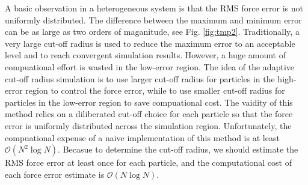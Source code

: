 \documentclass[aps,pre,preprint]{revtex4}
\begin{document}
A basic observation in a heterogeneous system is that the RMS force
error is not uniformly distributed. The difference between the maximum
and minimum error can be as large as two orders of maganitude, see
Fig. \ref{fig:tmp2}. Traditionally, a very large cut-off radius is
used to reduce the maximum error to an acceptable level and to reach
convergent simulation results. However, a huge amount of compuational
effort is wasted in the low-error region. The idea of the adaptive
cut-off radius simulation is to use larger cut-off radius for
particles in the high-error region to control the force error, while
to use smaller cut-off radius for particles in the low-error region to
save compuational cost.  The vaidity of this method relies on a
diliberated cut-off choice for each particle so that the force error
is uniformly distributed across the simulation region.  Unfortunately,
the compuational expense of a naive implementation of this method is
at least $\mathcal O(N^2\log N)$.  Becasue to determine the cut-off
radius, we should estimate the RMS force error at least once for each
particle, and the computational cost of each force error estimate is
$\mathcal O(N \log N)$.


\end{document}
